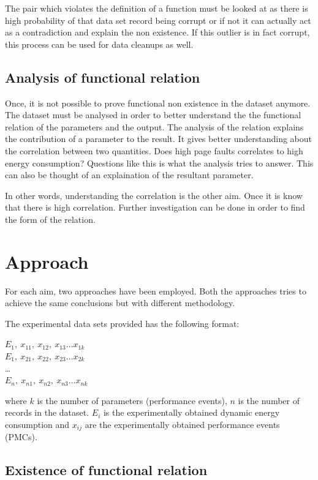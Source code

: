 The pair which violates the definition of a function must be looked at as there is high probability of that data set record being corrupt or if not it can actually act as a contradiction and explain the non existence. If this outlier is in fact corrupt, this process can be used for data cleanups as well.

\subsection{Analysis of functional relation}

Once, it is not possible to prove functional non existence in the dataset anymore. The dataset must be analysed in order to better understand the the functional relation of the parameters and the output. The analysis of the relation explains the contribution of a parameter to the result. It gives better understanding about the correlation between two quantities. Does high page faults correlates to high energy consumption? Questions like this is what the analysis tries to answer. This can also be thought of an explaination of the resultant parameter.

In other words, understanding the correlation is the other aim. Once it is know that there is high correlation. Further investigation can be done in order to find the form of the relation.

\section{Approach}

For each aim, two approaches have been employed. Both the approaches tries to achieve the same conclusions but with different methodology.

The experimental data sets provided has the following format:

\(E_1,\ x_{11},\ x_{12},\ x_{13} \ldots x_{1k}\)\\
\(E_1,\ x_{21},\ x_{22},\ x_{23} \ldots x_{2k}\)\\
\ldots \\
\(E_n,\ x_{n1},\ x_{n2},\ x_{n3} \ldots x_{nk}\)

where \(k\) is the number of parameters (performance events), \(n\) is the number of records in the dataset.
\(E_i\) is the experimentally obtained dynamic energy consumption and \(x_{ij}\) are the experimentally obtained performance events (PMCs).

\subsection{Existence of functional relation}

